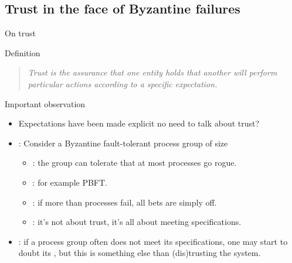 \subsection{Trust in the face of Byzantine failures}
\begin{slide}{On trust}
  \begin{alertblock}{Definition}
    \begin{quote}\itshape
      Trust is the assurance that one entity holds that another will perform particular actions according to a
      specific expectation.
    \end{quote}
  \end{alertblock}

  \begin{block}{Important observation}
    \begin{itemize}
    \item Expectations have been made explicit \mathexpr{\Rightarrow} no need to talk about trust?
    \item {}: Consider a Byzantine fault-tolerant process group of size 
      \begin{itemize}
      \item {}: the group can tolerate that at most  processes go
        rogue.
      \item {}: for example PBFT.
      \item {}: if more than  processes fail, all bets are simply off. 
      \item {}: it's not about trust, it's all about meeting specifications.
      \end{itemize}
    \item {}: if a process group often does not meet its specifications, one may start to
      doubt its , but this is something else than (dis)trusting the system.
    \end{itemize}
  \end{block}
\end{slide}
